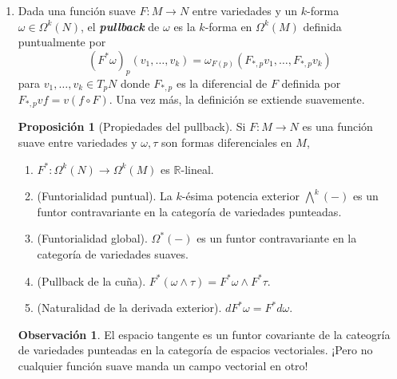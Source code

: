 \documentclass[spanish]{article}
\theoremstyle{definition}
\newtheorem*{prop}{Proposición}
\newtheorem*{obs}{Observación}
\newcommand{\R}{\mathbb{R}}
\DeclareMathOperator{\Id}{Id}
\begin{document}
\begin{enumerate}
		
		
		\item Dada una función suave $F:M\to N$ entre variedades y un $k$-forma $\omega\in \Omega^k(N)$, el \textbf{\textit{pullback}} de $\omega$ es la $k$-forma en $\Omega^k(M)$ definida puntualmente por
		\[(F^*\omega)_p(v_1,\ldots,v_k)=\omega_{F(p)}(F_{*,p}v_1,\ldots,F_{*,p}v_k)\]
		para $v_1,\ldots,v_k\in T_pN$ donde $F_{*,p}$ es la diferencial de $F$ definida por $F_{*,p}vf=v(f\circ F)$. Una vez más, la definición se extiende suavemente.
		
		\begin{prop}[Propiedades del pullback]
			Si $F:M\to N$ es una función suave entre variedades y $\omega,\tau$ son formas diferenciales en $M$,
			\begin{enumerate}
				\item $F^*:\Omega^k(N)\to\Omega^k(M)$ es $\R$-lineal.
				\item (Funtorialidad puntual). La $k$-ésima potencia exterior $\bigwedge^k(-)$ es un funtor contravariante en la categoría de variedades punteadas. 
				
				\item (Funtorialidad global). $\Omega^*(-)$ es un funtor contravariante en la categoría de variedades suaves.
				\item (Pullback de la cuña). $F^*(\omega\wedge\tau)=F^*\omega\wedge F^*\tau$.
			\item (Naturalidad de la derivada exterior).
			$dF^*\omega=F^*d\omega$.
		\end{enumerate}
		\end{prop}
		\begin{obs}
			El espacio tangente es un funtor covariante de la cateogría de variedades punteadas en la categoría de espacios vectoriales. ¡Pero no cualquier función suave manda un campo vectorial en otro!
		\end{obs}
		
		
		
	\end{enumerate}
\end{document}
